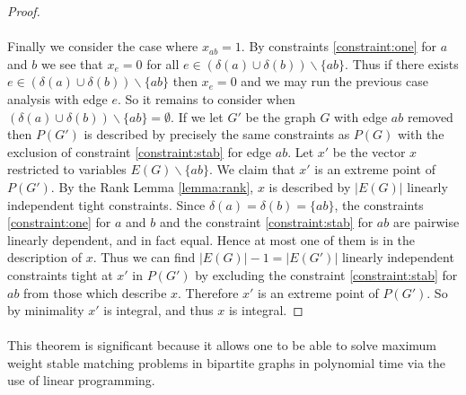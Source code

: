 \begin{proof}
\paragraph{}
Finally we consider the case where $x_{ab} = 1$. By constraints \ref{constraint:one} for $a$ and $b$ we see that $x_{e} = 0$ for all $e \in (\delta(a) \cup \delta(b))\backslash \{ab\}$. Thus if there exists $e \in (\delta(a) \cup \delta(b))\backslash \{ab\}$ then $x_e = 0$ and we may run the previous case analysis with edge $e$. So it remains to consider when $(\delta(a) \cup \delta(b))\backslash \{ab\} = \emptyset$. If we let $G'$ be the graph $G$ with edge $ab$ removed then $P(G')$ is described by precisely the same constraints as $P(G)$ with the exclusion of constraint \ref{constraint:stab} for edge $ab$. Let $x'$ be the vector $x$ restricted to variables $E(G)\backslash\{ab\}$. We claim that $x'$ is an extreme point of $P(G')$. By the Rank Lemma \ref{lemma:rank}, $x$ is described by $|E(G)|$ linearly independent tight constraints. Since $\delta(a) = \delta(b) = \{ab\}$, the constraints \ref{constraint:one} for $a$ and $b$ and the constraint \ref{constraint:stab} for $ab$ are pairwise linearly dependent, and in fact equal. Hence at most one of them is in the description of $x$. Thus we can find $|E(G)| -1 = |E(G')|$ linearly independent constraints tight at $x'$ in $P(G')$ by excluding the constraint \ref{constraint:stab} for $ab$ from those which describe $x$. Therefore $x'$ is an extreme point of $P(G')$. So by minimality $x'$ is integral, and thus $x$ is integral.
\end{proof}
\paragraph{}
This theorem is significant because it allows one to be able to solve maximum weight stable matching problems in bipartite graphs in polynomial time via the use of linear programming.